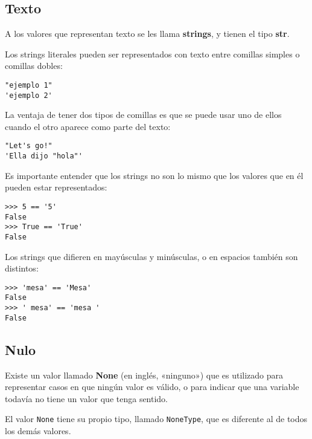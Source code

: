 \subsection{Texto}

A los valores que representan texto se les llama \textbf{strings}, y
tienen el tipo \textbf{str}.

Los strings literales pueden ser representados con texto entre comillas
simples o comillas dobles:

\begin{lstlisting}
"ejemplo 1"
'ejemplo 2'
\end{lstlisting}

La ventaja de tener dos tipos de comillas es que se puede usar uno de
ellos cuando el otro aparece como parte del texto:

\begin{lstlisting}
"Let's go!"
'Ella dijo "hola"'
\end{lstlisting}

Es importante entender que los strings no son lo mismo que los valores
que en él pueden estar representados:

\begin{lstlisting}
>>> 5 == '5'
False
>>> True == 'True'
False
\end{lstlisting}

Los strings que difieren en mayúsculas y minúsculas, o en espacios
también son distintos:

\begin{lstlisting}
>>> 'mesa' == 'Mesa'
False
>>> ' mesa' == 'mesa '
False
\end{lstlisting}

\subsection{Nulo}

Existe un valor llamado \textbf{None} (en inglés, «ninguno») que es
utilizado para representar casos en que ningún valor es válido, o para
indicar que una variable todavía no tiene un valor que tenga sentido.

El valor \lstinline!None! tiene su propio tipo, llamado
\lstinline!NoneType!, que es diferente al de todos los demás valores.
